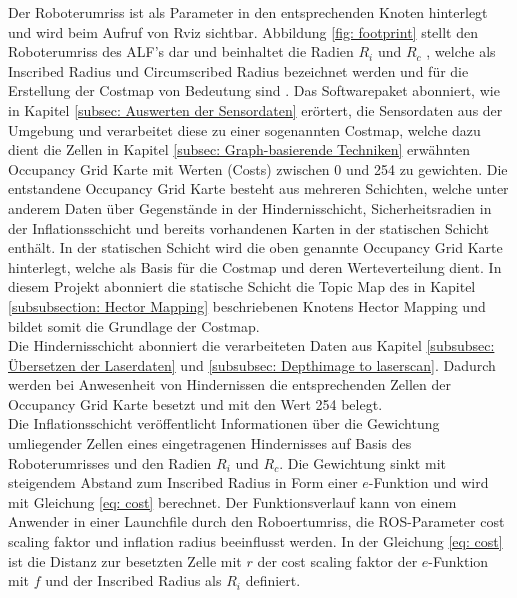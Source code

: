 		     Der Roboterumriss ist als Parameter in den entsprechenden Knoten hinterlegt und wird beim Aufruf von Rviz sichtbar. Abbildung \ref{fig: footprint} stellt den Roboterumriss des ALF's dar und beinhaltet die Radien $R_{i}$ und $R_{c}$ , welche als \glqq Inscribed Radius\grqq{} und \glqq Circumscribed Radius\grqq{} bezeichnet werden und für die Erstellung der Costmap von Bedeutung sind \cite{costmap}. Das Softwarepaket abonniert, wie in Kapitel \ref{subsec: Auswerten der Sensordaten} erörtert, die Sensordaten aus der Umgebung und verarbeitet diese zu einer sogenannten Costmap, welche dazu dient die Zellen in Kapitel \ref{subsec: Graph-basierende Techniken} erwähnten Occupancy Grid Karte mit Werten (Costs) zwischen 0 und 254 zu gewichten.
		  	Die entstandene Occupancy Grid Karte besteht aus mehreren Schichten, welche unter anderem Daten über Gegenstände in der Hindernisschicht, Sicherheitsradien in der Inflationsschicht und bereits vorhandenen Karten in der statischen Schicht enthält. In der statischen Schicht wird die oben genannte Occupancy Grid Karte hinterlegt, welche als Basis für die Costmap und deren Werteverteilung dient. In diesem Projekt abonniert die statische Schicht die Topic \glqq Map\grqq{} des in Kapitel \ref{subsubsection: Hector Mapping} beschriebenen Knotens Hector Mapping und bildet somit die Grundlage der Costmap. \cite{costmap}\\
		  	
		  	Die Hindernisschicht abonniert die verarbeiteten Daten aus Kapitel \ref{subsubsec: Übersetzen der Laserdaten} und \ref{subsubsec: Depthimage to laserscan}. Dadurch werden bei Anwesenheit von Hindernissen die entsprechenden Zellen der Occupancy Grid Karte besetzt und mit den Wert 254 belegt. \cite{costmap}\\
		  	
		  	Die Inflationsschicht veröffentlicht Informationen über die Gewichtung umliegender Zellen eines eingetragenen Hindernisses auf Basis des Roboterumrisses und den Radien $R_{i}$ und $R_{c}$. 
		  	Die Gewichtung sinkt mit steigendem Abstand zum Inscribed Radius in Form einer $e$-Funktion und wird mit Gleichung \ref{eq: cost} berechnet. Der Funktionsverlauf kann von einem Anwender in einer Launchfile durch den Roboertumriss, die ROS-Parameter \glqq cost scaling faktor\grqq{} und \glqq inflation radius\grqq{} beeinflusst werden.
		  	In der Gleichung \ref{eq: cost} ist die Distanz zur besetzten Zelle mit $r$ der cost scaling faktor der $e$-Funktion mit $f$ und der Inscribed Radius als $R_{i}$ definiert. \cite{costmap,inflation}
		  		
